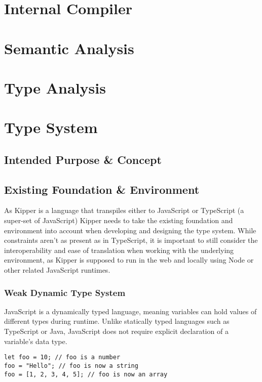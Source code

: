 \section{Internal Compiler}

\section{Semantic Analysis}

\section{Type Analysis}

\section{Type System}

\subsection{Intended Purpose \& Concept}

\subsection{Existing Foundation \& Environment}

As Kipper is a language that transpiles either to JavaScript or TypeScript (a super-set of JavaScript) Kipper needs to take the existing foundation and environment into account when developing and designing the type system. While constraints aren't as present as in TypeScript, it is important to still consider the interoperability and ease of translation when working with the underlying environment, as Kipper is supposed to run in the web and locally using Node or other related JavaScript runtimes.


\subsubsection{Weak Dynamic Type System}

JavaScript is a dynamically typed language, meaning variables can hold values of different types during runtime. Unlike statically typed languages such as TypeScript or Java, JavaScript does not require explicit declaration of a variable's data type.

\begin{lstlisting}[caption=Holding Values of different Types during Runtime]
let foo = 10; // foo is a number
foo = "Hello"; // foo is now a string
foo = [1, 2, 3, 4, 5]; // foo is now an array
\end{lstlisting}

